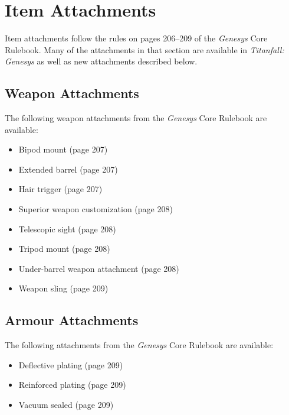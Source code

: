 \documentclass[9pt, openany]{extbook}
\begin{document}
\chapter{Item Attachments}
Item attachments follow the rules on pages 206--209 of the \emph{Genesys} Core Rulebook. Many of the attachments in that section are available in \emph{Titanfall: Genesys} as well as new attachments described below.

\section{Weapon Attachments}

The following weapon attachments from the \emph{Genesys} Core Rulebook are available:

\begin{itemize}[noitemsep]
\item Bipod mount (page 207)
\item Extended barrel (page 207)
\item Hair trigger (page 207)
\item Superior weapon customization (page 208)
\item Telescopic sight (page 208)
\item Tripod mount (page 208)
\item Under-barrel weapon attachment (page 208)
\item Weapon sling (page 209)
\end{itemize}



\section{Armour Attachments}
The following attachments from the \emph{Genesys} Core Rulebook are available:

\begin{itemize}[noitemsep]
\item Deflective plating (page 209)
\item Reinforced plating (page 209)
\item Vacuum sealed (page 209)
\end{itemize}




\appendix
\end{document}
